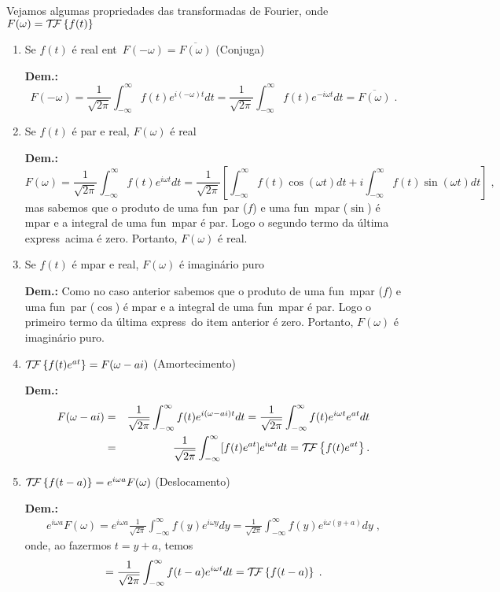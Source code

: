 Vejamos algumas propriedades das transformadas de Fourier, onde
$F(\omega) = {\cal T \kern-2pt F} \left\{ f(t) \right\}$
\begin{enumerate}
\item Se $f(t)$ \'e real ent\ao\ $F(-\omega) =
\overline{F(\omega)}$ (Conjuga\cao)

{\bf Dem.:} 
\[F(-\omega) = \frac{1}{\sqrt{2\pi}} \int_{-\infty}^{\infty}
f(t) e^{i(-\omega)t} dt = \frac{1}{\sqrt{2\pi}} \int_{-\infty}^{\infty}
f(t) e^{-i \omega t} dt = \overline{F(\omega)} \; .\]

\item Se $f(t)$ \'e par e real, $F(\omega)$ \'e real

{\bf Dem.:} 
\[F(\omega) = \frac{1}{\sqrt{2\pi}} \int_{-\infty}^{\infty}
f(t) e^{i \omega t} dt = \frac{1}{\sqrt{2\pi}} \left[ 
\int_{-\infty}^{\infty} f(t) \cos(\omega t) dt +
i \int_{-\infty}^{\infty} f(t) \sin(\omega t) dt \right] \; ,\]
mas sabemos que o produto de uma fun\cao\ par ($f$) e uma fun\cao\
\ih mpar ($\sin$) \'e \ih mpar e a integral de uma fun\cao\ \ih mpar
\'e par. Logo o segundo termo da \'ultima express\ao\ acima \'e zero.
Portanto, $F(\omega)$ \'e real.

\item Se $f(t)$ \'e \ih mpar e real, $F(\omega)$ \'e imagin\'ario puro

{\bf Dem.:} Como no caso anterior sabemos que o produto de uma fun\cao\
\ih mpar ($f$) e uma fun\cao\ par ($\cos$) \'e \ih mpar e a integral
de uma fun\cao\ \ih mpar \'e par. Logo o primeiro termo da \'ultima
express\ao\ do item anterior \'e zero. Portanto, $F(\omega)$ \'e
imagin\'ario puro.

\item ${\cal T \kern-2pt F} \left\{ f(t)e^{at} \right\} = F(\omega-ai)$ (Amortecimento)

{\bf Dem.:} 
\begin{eqnarray*}
F(\omega-ai) &=& \frac{1}{\sqrt{2\pi}} \int_{-\infty}^{\infty}
f(t) e^{i (\omega-ai) t} dt = \frac{1}{\sqrt{2\pi}}
\int_{-\infty}^{\infty} f(t) e^{i \omega t} e^{at} dt \\
&=& \frac{1}{\sqrt{2\pi}} \int_{-\infty}^{\infty} [f(t) e^{at}]
 e^{i \omega t} dt = {\cal T \kern-2pt F} \left\{ f(t) e^{at} \right\}.
\end{eqnarray*}

\item ${\cal T \kern-2pt F} \left\{ f(t-a) \right\} = e^{i \omega a} F(\omega)$ (Deslocamento)

{\bf Dem.:}
\begin{eqnarray*}
e^{i\omega a} F(\omega) = e^{i\omega a} \frac{1}{\sqrt{2\pi}}
\int_{-\infty}^{\infty} f(y) e^{i \omega y} dy =
\frac{1}{\sqrt{2\pi}}\int_{-\infty}^{\infty}f(y) e^{i\omega(y+a)}dy \; ,
\end{eqnarray*}
onde, ao fazermos  $t = y + a$, temos
\begin{eqnarray*}
= \frac{1}{\sqrt{2\pi}} \int_{-\infty}^{\infty} f(t-a) e^{i\omega t}dt
= {\cal T \kern-2pt F} \left\{ f(t-a) \right\} \; .
\end{eqnarray*}



\end{enumerate}
